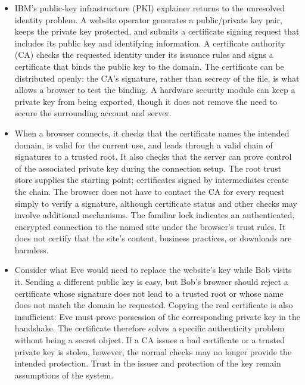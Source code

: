 \documentclass[10pt]{article}
\begin{document}
\begin{itemize}[leftmargin=1.25em, itemsep=0.3em, parsep=0pt, topsep=0pt]
    \item IBM's public-key infrastructure (PKI) explainer returns to the unresolved identity problem. A website operator generates a public/private key pair, keeps the private key protected, and submits a certificate signing request that includes its public key and identifying information. A certificate authority (CA) checks the requested identity under its issuance rules and signs a certificate that binds the public key to the domain. The certificate can be distributed openly: the CA's signature, rather than secrecy of the file, is what allows a browser to test the binding. A hardware security module can keep a private key from being exported, though it does not remove the need to secure the surrounding account and server.

    \item When a browser connects, it checks that the certificate names the intended domain, is valid for the current use, and leads through a valid chain of signatures to a trusted root. It also checks that the server can prove control of the associated private key during the connection setup. The root trust store supplies the starting point; certificates signed by intermediates create the chain. The browser does not have to contact the CA for every request simply to verify a signature, although certificate status and other checks may involve additional mechanisms. The familiar lock indicates an authenticated, encrypted connection to the named site under the browser's trust rules. It does not certify that the site's content, business practices, or downloads are harmless.

    \item Consider what Eve would need to replace the website's key while Bob visits it. Sending a different public key is easy, but Bob's browser should reject a certificate whose signature does not lead to a trusted root or whose name does not match the domain he requested. Copying the real certificate is also insufficient: Eve must prove possession of the corresponding private key in the handshake. The certificate therefore solves a specific authenticity problem without being a secret object. If a CA issues a bad certificate or a trusted private key is stolen, however, the normal checks may no longer provide the intended protection. Trust in the issuer and protection of the key remain assumptions of the system.


\end{itemize}
\end{document}
